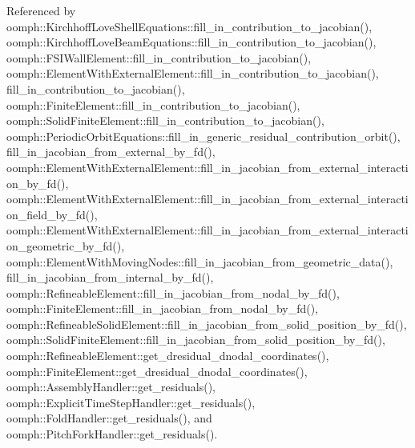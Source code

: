 Referenced by oomph\+::\+Kirchhoff\+Love\+Shell\+Equations\+::fill\+\_\+in\+\_\+contribution\+\_\+to\+\_\+jacobian(), oomph\+::\+Kirchhoff\+Love\+Beam\+Equations\+::fill\+\_\+in\+\_\+contribution\+\_\+to\+\_\+jacobian(), oomph\+::\+F\+S\+I\+Wall\+Element\+::fill\+\_\+in\+\_\+contribution\+\_\+to\+\_\+jacobian(), oomph\+::\+Element\+With\+External\+Element\+::fill\+\_\+in\+\_\+contribution\+\_\+to\+\_\+jacobian(), fill\+\_\+in\+\_\+contribution\+\_\+to\+\_\+jacobian(), oomph\+::\+Finite\+Element\+::fill\+\_\+in\+\_\+contribution\+\_\+to\+\_\+jacobian(), oomph\+::\+Solid\+Finite\+Element\+::fill\+\_\+in\+\_\+contribution\+\_\+to\+\_\+jacobian(), oomph\+::\+Periodic\+Orbit\+Equations\+::fill\+\_\+in\+\_\+generic\+\_\+residual\+\_\+contribution\+\_\+orbit(), fill\+\_\+in\+\_\+jacobian\+\_\+from\+\_\+external\+\_\+by\+\_\+fd(), oomph\+::\+Element\+With\+External\+Element\+::fill\+\_\+in\+\_\+jacobian\+\_\+from\+\_\+external\+\_\+interaction\+\_\+by\+\_\+fd(), oomph\+::\+Element\+With\+External\+Element\+::fill\+\_\+in\+\_\+jacobian\+\_\+from\+\_\+external\+\_\+interaction\+\_\+field\+\_\+by\+\_\+fd(), oomph\+::\+Element\+With\+External\+Element\+::fill\+\_\+in\+\_\+jacobian\+\_\+from\+\_\+external\+\_\+interaction\+\_\+geometric\+\_\+by\+\_\+fd(), oomph\+::\+Element\+With\+Moving\+Nodes\+::fill\+\_\+in\+\_\+jacobian\+\_\+from\+\_\+geometric\+\_\+data(), fill\+\_\+in\+\_\+jacobian\+\_\+from\+\_\+internal\+\_\+by\+\_\+fd(), oomph\+::\+Refineable\+Element\+::fill\+\_\+in\+\_\+jacobian\+\_\+from\+\_\+nodal\+\_\+by\+\_\+fd(), oomph\+::\+Finite\+Element\+::fill\+\_\+in\+\_\+jacobian\+\_\+from\+\_\+nodal\+\_\+by\+\_\+fd(), oomph\+::\+Refineable\+Solid\+Element\+::fill\+\_\+in\+\_\+jacobian\+\_\+from\+\_\+solid\+\_\+position\+\_\+by\+\_\+fd(), oomph\+::\+Solid\+Finite\+Element\+::fill\+\_\+in\+\_\+jacobian\+\_\+from\+\_\+solid\+\_\+position\+\_\+by\+\_\+fd(), oomph\+::\+Refineable\+Element\+::get\+\_\+dresidual\+\_\+dnodal\+\_\+coordinates(), oomph\+::\+Finite\+Element\+::get\+\_\+dresidual\+\_\+dnodal\+\_\+coordinates(), oomph\+::\+Assembly\+Handler\+::get\+\_\+residuals(), oomph\+::\+Explicit\+Time\+Step\+Handler\+::get\+\_\+residuals(), oomph\+::\+Fold\+Handler\+::get\+\_\+residuals(), and oomph\+::\+Pitch\+Fork\+Handler\+::get\+\_\+residuals().

\mbox{\label{classoomph_1_1GeneralisedElement_ac65bd63d3959f613a845cdbaff0420de}} 
